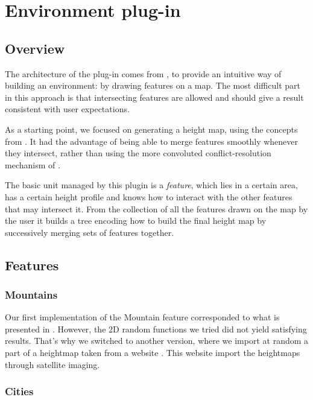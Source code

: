 \section{Environment plug-in}

\subsection{Overview}

The architecture of the plug-in comes from \cite{DeclarativeArchitecture}, to
provide an intuitive way of building an environment: by drawing features on a
map. The most difficult part in this approach is that intersecting features are
allowed and should give a result consistent with user expectations.

As a starting point, we focused on generating a height map, using the concepts
from \cite{FeatureTree}. It had the advantage of being able to merge features
smoothly whenever they intersect, rather than using the more convoluted
conflict-resolution mechanism of \cite{DeclarativeArchitecture}.

\bigskip

The basic unit managed by this plugin is a \emph{feature}, which lies in a
certain area, has a certain height profile and knows how to interact with the
other features that may intersect it. From the collection of all the features
drawn on the map by the user it builds a tree encoding how to build the final
height map by successively merging sets of features together.


\subsection{Features}

\subsubsection{Mountains}

Our first implementation of the Mountain feature corresponded to what is presented in \cite{FeatureTree}. However, the 2D random functions we tried did not yield satisfying results. That's why we switched to another version, where we import at random a part of a heightmap taken from a website \cite{terrain-party}. This website import the heightmaps through satellite imaging.

\subsubsection{Cities}

